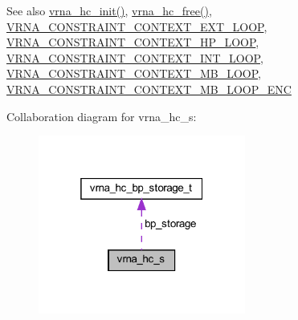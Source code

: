 \begin{DoxySeeAlso}{See also}
\hyperlink{group__hard__constraints_ga36ff456c43bf920629cee5a236e4f0ff}{vrna\+\_\+hc\+\_\+init()}, \hyperlink{group__hard__constraints_ga696dcf77887d856c6f21ea266d8b9ca2}{vrna\+\_\+hc\+\_\+free()}, \hyperlink{group__hard__constraints_ga9418eda62a5dec070896702c279d2548}{V\+R\+N\+A\+\_\+\+C\+O\+N\+S\+T\+R\+A\+I\+N\+T\+\_\+\+C\+O\+N\+T\+E\+X\+T\+\_\+\+E\+X\+T\+\_\+\+L\+O\+OP}, \hyperlink{group__hard__constraints_ga79203702b197b6b9d3b78eed40663eb1}{V\+R\+N\+A\+\_\+\+C\+O\+N\+S\+T\+R\+A\+I\+N\+T\+\_\+\+C\+O\+N\+T\+E\+X\+T\+\_\+\+H\+P\+\_\+\+L\+O\+OP}, \hyperlink{group__hard__constraints_ga21feeab3a9e5fa5a9e3d9ac0fcf5994f}{V\+R\+N\+A\+\_\+\+C\+O\+N\+S\+T\+R\+A\+I\+N\+T\+\_\+\+C\+O\+N\+T\+E\+X\+T\+\_\+\+I\+N\+T\+\_\+\+L\+O\+OP}, \hyperlink{group__hard__constraints_ga456ecd2ff00056bb64da8dd4f61bbfc5}{V\+R\+N\+A\+\_\+\+C\+O\+N\+S\+T\+R\+A\+I\+N\+T\+\_\+\+C\+O\+N\+T\+E\+X\+T\+\_\+\+M\+B\+\_\+\+L\+O\+OP}, \hyperlink{group__hard__constraints_ga02a3d703ddbcfce393e4bbfcb9db7077}{V\+R\+N\+A\+\_\+\+C\+O\+N\+S\+T\+R\+A\+I\+N\+T\+\_\+\+C\+O\+N\+T\+E\+X\+T\+\_\+\+M\+B\+\_\+\+L\+O\+O\+P\+\_\+\+E\+NC} 
\end{DoxySeeAlso}


Collaboration diagram for vrna\+\_\+hc\+\_\+s\+:
\nopagebreak
\begin{figure}[H]
\begin{center}
\leavevmode
\includegraphics[width=193pt]{structvrna__hc__s__coll__graph}
\end{center}
\end{figure}
